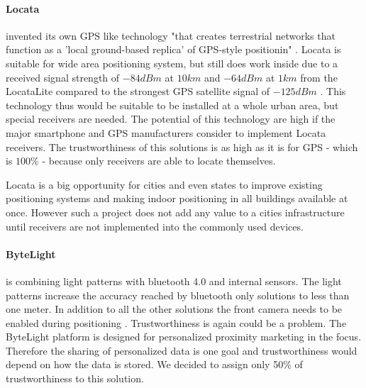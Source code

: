 \paragraph{Locata} invented its own GPS like technology "that creates terrestrial networks that function as a 'local ground-based replica' of GPS-style positionin" \parencite{locata}. Locata is suitable for wide area positioning system, but still does work inside due to a received signal strength of $-84 dBm$ at $10 km$ and $-64 dBm$ at $1 km$ from the LocataLite compared to the strongest GPS satellite signal of $-125 dBm$ \parencite{locata}.
This technology thus would be suitable to be installed at a whole urban area, but special receivers are needed. The potential of this technology are high if the major smartphone and GPS manufacturers consider to implement Locata receivers. The trustworthiness of this solutions is as high as it is for GPS - which is $100\%$ - because only receivers are able to locate themselves. 

Locata is a big opportunity for cities and even states to improve existing positioning systems and making indoor positioning in all buildings available at once. However such a project does not add any value to a cities infrastructure until receivers are not implemented into the commonly used devices.  

\paragraph{ByteLight} is combining light patterns with bluetooth 4.0 and internal sensors. The light patterns increase the accuracy reached by bluetooth only solutions to less than one meter. In addition to all the other solutions the front camera needs to be enabled during positioning \parencite{bytelight}. Trustworthiness is again could be a problem. The ByteLight platform is designed for personalized proximity marketing in the focus. Therefore the sharing of personalized data is one goal and trustworthiness would depend on how the data is stored. We decided to assign only 50\% of trustworthiness to this solution. 


